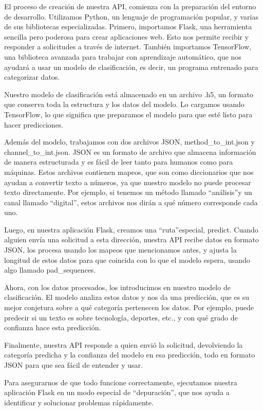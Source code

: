 El proceso de creación de nuestra API, comienza con la preparación del entorno de desarrollo. Utilizamos Python, un lenguaje de programación popular, y varias de sus bibliotecas especializadas. Primero, importamos Flask, una herramienta sencilla pero poderosa para crear aplicaciones web. Esto nos permite recibir y responder a solicitudes a través de internet. También importamos TensorFlow, una biblioteca avanzada para trabajar con aprendizaje automático, que nos ayudará a usar un modelo de clasificación, es decir, un programa entrenado para categorizar datos.

Nuestro modelo de clasificación está almacenado en un archivo .h5, un formato que conserva toda la estructura y los datos del modelo. Lo cargamos usando TensorFlow, lo que significa que preparamos el modelo para que esté listo para hacer predicciones.

Además del modelo, trabajamos con dos archivos JSON, method\_to\_int.json y channel\_to\_int.json. JSON es un formato de archivo que almacena información de manera estructurada y es fácil de leer tanto para humanos como para máquinas. Estos archivos contienen mapeos, que son como diccionarios que nos ayudan a convertir texto a números, ya que nuestro modelo no puede procesar texto directamente. Por ejemplo, si tenemos un método llamado \textquotedblleft análisis\textquotedblright y un canal llamado \textquotedblleft digital\textquotedblright, estos archivos nos dirán a qué número corresponde cada uno.

Luego, en nuestra aplicación Flask, creamos una \textquotedblleft ruta\textquotedblright especial, \/predict. Cuando alguien envía una solicitud a esta dirección, nuestra API recibe datos en formato JSON, los procesa usando los mapeos que mencionamos antes, y ajusta la longitud de estos datos para que coincida con lo que el modelo espera, usando algo llamado pad\_sequences.

Ahora, con los datos procesados, los introducimos en nuestro modelo de clasificación. El modelo analiza estos datos y nos da una predicción, que es su mejor conjetura sobre a qué categoría pertenecen los datos. Por ejemplo, puede predecir si un texto es sobre tecnología, deportes, etc., y con qué grado de confianza hace esta predicción.

Finalmente, nuestra API responde a quien envió la solicitud, devolviendo la categoría predicha y la confianza del modelo en esa predicción, todo en formato JSON para que sea fácil de entender y usar.

Para asegurarnos de que todo funcione correctamente, ejecutamos nuestra aplicación Flask en un modo especial de \textquotedblleft depuración\textquotedblright, que nos ayuda a identificar y solucionar problemas rápidamente.